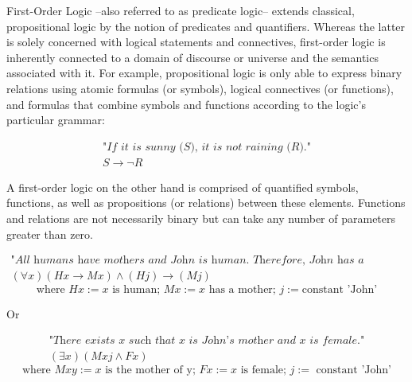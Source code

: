 First-Order Logic --also referred to as predicate logic-- extends classical, propositional logic by the notion of predicates and quantifiers.
Whereas the latter is solely concerned with logical statements and connectives, first-order logic is inherently connected to a domain of discourse or universe and the semantics associated with it.
For example, propositional logic is only able to express binary relations using atomic formulas (or symbols), logical connectives (or functions), and formulas that combine symbols and functions according to the logic's particular grammar:

\begin{equation*}
    \begin{gathered}
        \textit{"If it is sunny (S), it is not raining (R)."}\\
        S \rightarrow \lnot R
    \end{gathered}
\end{equation*}

A first-order logic on the other hand is comprised of quantified symbols, functions, as well as propositions (or relations) between these elements.
Functions and relations are not necessarily binary but can take any number of parameters greater than zero.

\begin{equation*}
    \begin{gathered}
        \textit{"All humans have mothers and John is human. Therefore, John has a mother."}\\
        (\forall x)(Hx \rightarrow Mx) \wedge (Hj) \rightarrow (Mj)
    \end{gathered}
\end{equation*}
\begin{equation*}
    \text{where }
    Hx:= x \text{ is human; }
    Mx:= x \text{ has a mother; }
    j:= \text{constant 'John'}
\end{equation*}

Or

\begin{equation*}
    \begin{gathered}
        \textit{"There exists x such that x is John's mother and x is female."}\\
        (\exists x)(Mxj \wedge Fx)
    \end{gathered}
\end{equation*}
\begin{equation*}
    \text{where }
    Mxy:= x \text{ is the mother of y; }
    Fx:= x \text{ is female; }
    j:= \text{ constant 'John'}
\end{equation*}

